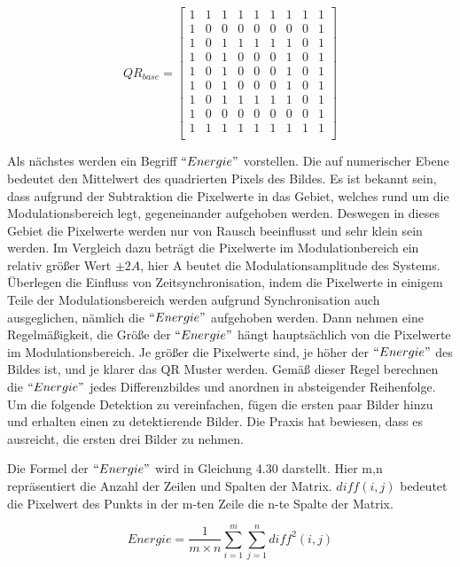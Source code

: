 \begin{equation}
QR_{base} = \begin{bmatrix}
    1 &1 &1 &1 &1 &1 &1 &1 &1 \\
    1 &0 &0 &0 &0 &0 &0 &0 &1 \\
    1 &0 &1 &1 &1 &1 &1 &0 &1 \\ 
    1 &0 &1 &0 &0 &0 &1 &0 &1 \\ 
    1 &0 &1 &0 &0 &0 &1 &0 &1 \\ 
    1 &0 &1 &0 &0 &0 &1 &0 &1 \\ 
    1 &0 &1 &1 &1 &1 &1 &0 &1 \\ 
    1 &0 &0 &0 &0 &0 &0 &0 &1 \\ 
    1 &1 &1 &1 &1 &1 &1 &1 &1 \\ 
\end{bmatrix}
\end{equation}

Als nächstes werden ein Begriff $``Energie"$ vorstellen. Die auf numerischer Ebene bedeutet den Mittelwert des quadrierten Pixels des Bildes. Es ist bekannt sein, dass aufgrund der Subtraktion die Pixelwerte in das Gebiet, welches rund um die Modulationsbereich legt, gegeneinander aufgehoben werden. Deswegen in dieses Gebiet die Pixelwerte werden nur von Rausch beeinflusst und sehr klein sein werden. Im Vergleich dazu beträgt die Pixelwerte im Modulationbereich ein relativ größer Wert $\pm2A$, hier A beutet die Modulationsamplitude des Systems. Überlegen die Einfluss von Zeitsynchronisation, indem die Pixelwerte in einigem Teile der Modulationsbereich werden aufgrund Synchronisation auch ausgeglichen, nämlich die $``Energie"$ aufgehoben werden. Dann nehmen eine Regelmäßigkeit, die Größe der $``Energie"$ hängt hauptsächlich von die Pixelwerte im Modulationsbereich. Je größer die Pixelwerte sind, je höher der $``Energie"$ des Bildes ist, und je klarer das QR Muster werden. Gemäß dieser Regel berechnen die $``Energie"$ jedes Differenzbildes und anordnen in absteigender Reihenfolge. Um die folgende Detektion zu vereinfachen, fügen die ersten paar Bilder hinzu und erhalten einen zu detektierende Bilder. Die Praxis hat bewiesen, dass es ausreicht, die ersten drei Bilder zu nehmen.

Die Formel der $``Energie"$ wird in Gleichung 4.30 darstellt. Hier m,n repräsentiert die Anzahl der Zeilen und Spalten der Matrix. $diff(i,j)$ bedeutet die Pixelwert des Punkts in der m-ten Zeile die n-te Spalte der Matrix.

\begin{equation}
Energie = \frac{1}{m \times n} \sum_{i=1}^m \sum_{j=1}^n diff^2(i,j) 
\end{equation}

